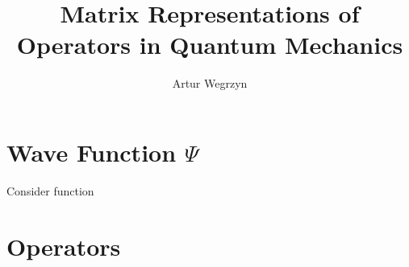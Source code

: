 \documentclass[12pt]{article}
\begin{document}
\title{Matrix Representations of Operators in Quantum Mechanics}
\author{Artur Wegrzyn}
\maketitle

\abstract{}


\tableofcontents

\section{Wave Function $\Psi$}
Consider function $$

\section{Operators }
\end{document}
